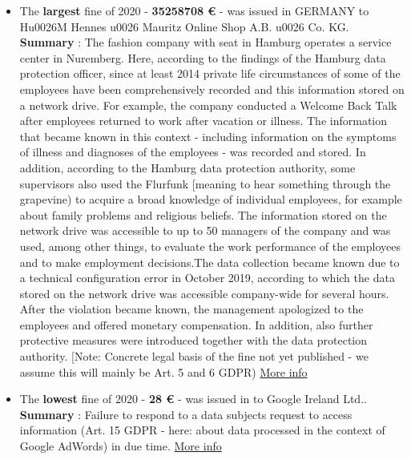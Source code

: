 \documentclass[12pt]{article}
\begin{document}
\newpage
\justify
	\begin{multicols}{2}
	\raggedright{}
		\begin{itemize}
			\item The \textbf{largest} fine of 2020 - \textbf{35258708 €} - was issued in GERMANY to Hu0026M Hennes u0026 Mauritz Online Shop A.B. u0026 Co. KG.
			\newline
			\textbf{Summary} : The fashion company with seat in Hamburg operates a service center in Nuremberg. Here, according to the findings of the Hamburg data protection officer, since at least 2014 private life circumstances of some of the employees have been comprehensively recorded and this information stored on a network drive. For example, the company conducted a Welcome Back Talk after employees returned to work after vacation or illness. The information that became known in this context - including information on the symptoms of illness and diagnoses of the employees - was recorded and stored. In addition, according to the Hamburg data protection authority, some supervisors also used the Flurfunk [meaning to hear something through the grapevine) to acquire a broad knowledge of individual employees, for example about family problems and religious beliefs. The information stored on the network drive was accessible to up to 50 managers of the company and was used, among other things, to evaluate the work performance of the employees and to make employment decisions.The data collection became known due to a technical configuration error in October 2019, according to which the data stored on the network drive was accessible company-wide for several hours. After the violation became known, the management apologized to the employees and offered monetary compensation. In addition, also further protective measures were introduced together with the data protection authority. [Note: Concrete legal basis of the fine not yet published - we assume this will mainly be Art. 5 and 6 GDPR)
			\newline
			\href{https://datenschutz-hamburg.de/pressemitteilungen/2020/10/2020-10-01-h-m-verfahren}{More info}
			\vspace{1cm}
		
			\item The \textbf{lowest} fine of 2020 - \textbf{28 €} - was issued in  to Google Ireland Ltd..
			\newline
			\textbf{Summary} : Failure to respond to a data subjects request to access information (Art. 15 GDPR - here: about data processed in the context of Google AdWords) in due time.
			\newline
			\href{https://www.naih.hu/files/NAIH-2020-5553-hatarozat.pdf}{More info}
		\end{itemize}
	\end{multicols}
\end{document}
